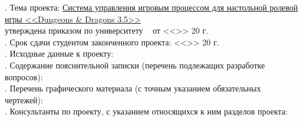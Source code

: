 . Тема проекта: \uline{Система управления игровым процессом для настольной ролевой игры <<Dungeons \& Dragons 3.5>>\hfill}\\
\noindent утверждена приказом по университету \No~\underline{\hspace{1.5cm}} от <<\underline{\hspace{1cm}}>>\underline{\hspace{3.5cm}} 20\underline{\hspace{0.8cm}} г.\\
. Срок сдачи студентом законченного проекта: \hspace{0.8cm} <<\underline{\hspace{1cm}}>>\underline{\hspace{3.5cm}} 20\underline{\hspace{0.8cm}} г.\\
. Исходные данные к проекту: \uline{\hfill}\\
\noindent \underline{\hspace{\textwidth}}
\noindent \underline{\hspace{\textwidth}}
\noindent \underline{\hspace{\textwidth}}
. Содержание пояснительной записки (перечень подлежащих разработке вопросов): \uline{\hfill}\\
\noindent \underline{\hspace{\textwidth}}
\noindent \underline{\hspace{\textwidth}}
. Перечень графического материала (с точным указанием обязательных чертежей): \uline{\hfill}\\
\noindent \underline{\hspace{\textwidth}}
\noindent \underline{\hspace{\textwidth}}
\noindent \underline{\hspace{\textwidth}}
. Консультанты по проекту, с указанием относящихся к ним разделов проекта: \uline{\hfill}\\
\noindent \underline{\hspace{\textwidth}}
\noindent \underline{\hspace{\textwidth}}
\noindent \underline{\hspace{\textwidth}}
\noindent \underline{\hspace{\textwidth}}

\restoregeometry

